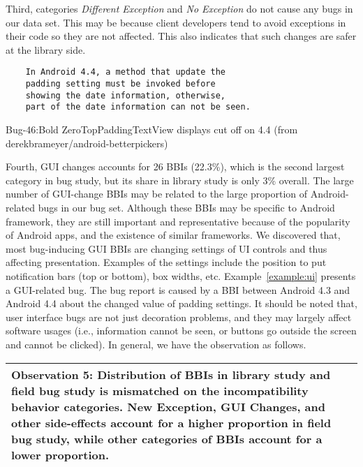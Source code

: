 Third, categories \textit{Different Exception} and \textit{No Exception} do not cause any bugs in our data set. This may be because client developers tend to avoid exceptions in their code so they are not affected. This also indicates that such changes are safer at the library side. 

\begin{example}

		\begin{verbatim}
	In Android 4.4, a method that update the 
	padding setting must be invoked before 
	showing the date information, otherwise, 
	part of the date information can not be seen.
		\end{verbatim}
	\caption{Bug-46:Bold ZeroTopPaddingTextView displays cut off on 4.4 (\small{from derekbrameyer/android-betterpickers})} 
	\label{example:ui} 
	
\end{example}
	
Fourth, GUI changes accounts for 26 BBIs (22.3\%), which is the second largest category in bug study, but its share in library study is only 3\% overall. The large number of GUI-change BBIs may be related to the large proportion of Android-related bugs in our bug set. Although these BBIs may be specific to Android framework, they are still important and representative because of the popularity of Android apps, and the existence of similar frameworks. We discovered that, most bug-inducing GUI BBIs are changing settings of UI controls and thus affecting presentation. Examples of the settings include the position to put notification bars (top or bottom), box widths, etc. Example~\ref{example:ui} presents a GUI-related bug. The bug report is caused by a BBI between Android 4.3 and Android 4.4 about the changed value of padding settings. It should be noted that, user interface bugs are not just decoration problems, and they may largely affect software usages (i.e., information cannot be seen, or buttons go outside the screen and cannot be clicked). In general, we have the observation as follows.\\



\medskip
\noindent\begin{tabular}{|p{16cm}|}
	\hline
	\textbf{Observation 5:} Distribution of BBIs in library study and field bug study is mismatched on the incompatibility behavior categories. New Exception, GUI Changes, and other side-effects account for a higher proportion in field bug study, while other categories of BBIs account for a lower proportion.\\
	\hline
\end{tabular}
\medskip
\vspace{+0.2cm}




